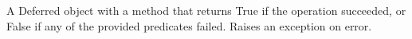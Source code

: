A Deferred object with a  method that returns True if the operation
succeeded, or False if any of the provided predicates failed.  Raises an
exception on error.
